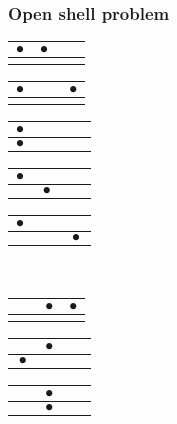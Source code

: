 \begin{frame}[t]
  \frametitle{Open shell problem}
  \footnotesize
  \begin{center}
  \vspace{-0.5em}
  \begin{tabular}{|c|c|c|}
  \hline
  $\bullet$ & $\bullet$ & $\phantom{\bullet}$ \\ \hline
  &  &  \\
  \hline
  \end{tabular}
  \begin{tabular}{|c|c|c|}
  \hline
  $\bullet$ & $\phantom{\bullet}$ & $\bullet$ \\ \hline
  &  &  \\
  \hline
  \end{tabular}
  \begin{tabular}{|c|c|c|}
  \hline
  $\bullet$ & $\phantom{\bullet}$ & $\phantom{\bullet}$ \\ \hline
  $\bullet$ &  &  \\
  \hline
  \end{tabular}
  \begin{tabular}{|c|c|c|}
  \hline
  $\bullet$ & $\phantom{\bullet}$ & $\phantom{\bullet}$ \\ \hline
  & $\bullet$ &  \\
  \hline
  \end{tabular}
  \begin{tabular}{|c|c|c|}
  \hline
  $\bullet$ & $\phantom{\bullet}$ & $\phantom{\bullet}$ \\ \hline
  &  & $\bullet$ \\
  \hline
  \end{tabular} \\
  \vspace{0.5em}
  \begin{tabular}{|c|c|c|}
  \hline
  $\phantom{\bullet}$ & $\bullet$ & $\bullet$ \\ \hline
  &  &  \\
  \hline
  \end{tabular}
  \begin{tabular}{|c|c|c|}
  \hline
  $\phantom{\bullet}$ & $\bullet$ & $\phantom{\bullet}$ \\ \hline
  $\bullet$ &  &  \\
  \hline
  \end{tabular}
  \begin{tabular}{|c|c|c|}
  \hline
  $\phantom{\bullet}$ & $\bullet$ & $\phantom{\bullet}$ \\ \hline
  & $\bullet$ &  \\

\end{tabular}
\end{center}
\end{frame}
